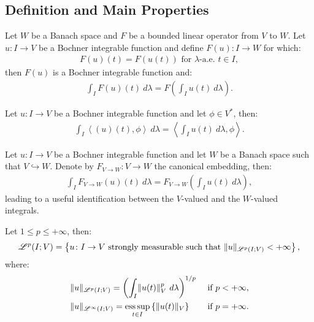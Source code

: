 \subsection{Definition and Main Properties}

\begin{corollary}
    Let $W$ be a Banach space and $F$ be a bounded linear operator from $V$ to $W$. Let $u\colon I \rightarrow V$ be a Bochner integrable function and define $F(u) \colon I \rightarrow W$ for which:
    \begin{gather}
        F(u)(t) = F(u(t)) \text{ for } \lambda \text{-a.e. } t \in I,
    \end{gather}
    then $F(u)$ is a Bochner integrable function and:
    \begin{gather}
        \int_I F(u)(t) ~ d \lambda = F\left( \int_I u(t) ~ d \lambda \right).
    \end{gather}
\end{corollary}

\begin{remark} %
    Let $u\colon I \rightarrow V$ be a Bochner integrable function and let $\phi \in V^{*}$, then:
    \begin{gather}
        \int_I \left\langle (u)(t), \phi \right\rangle ~ d \lambda = \left\langle \int_I u(t) ~ d \lambda, \phi \right\rangle.
    \end{gather}
\end{remark}

\begin{remark}[Embedding]
    Let $u\colon I \rightarrow V$ be a Bochner integrable function and let $W$ be a Banach space such that $V \hookrightarrow W$. Denote by $F_{V \rightarrow W} \colon V \rightarrow W$ the canonical embedding, then:
    \begin{gather}
        \int_I F_{V \rightarrow W}(u)(t) ~ d \lambda = F_{V \rightarrow W}\left( \int_I u(t) ~ d \lambda \right),
    \end{gather}
    leading to a useful identification between the $V$-valued and the $W$-valued integrals.
\end{remark}

\begin{definition}[$\Lp{p}(I; V)$]
    Let $1 \leq p \leq +\infty$, then:
    \begin{gather}
        \mathscr{L}^{p}(I; V) = \left\{ u \colon I \rightarrow V \text{ strongly measurable such that } \lVert u \rVert_{\mathscr{L}^{p}(I; V)} < +\infty \right\},
    \end{gather}
    where:
    \begin{align}
        & \lVert u \rVert_{\mathscr{L}^{p}(I; V)} = \left( \int_I \lVert u(t) \rVert_V^p ~ d \lambda \right)^{1/p} & \text{ if } p < +\infty, \\
        & \lVert u \rVert_{\mathscr{L}^{\infty}(I; V)} = \operatorname*{ess\,sup}_{t \in I} \left\{ \lVert u(t) \rVert_V \right\} & \text{ if } p = +\infty.
    \end{align}
\end{definition}

